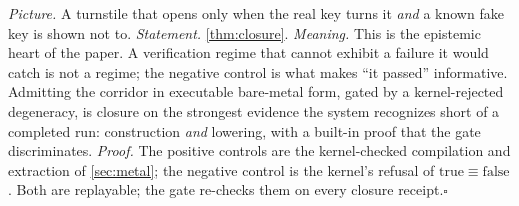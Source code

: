 \documentclass[11pt,letterpaper]{article}
\theoremstyle{plain}
\theoremstyle{definition}
\theoremstyle{remark}
\begin{document}
\noindent\emph{Picture.} A turnstile that opens only when the real key turns it
\emph{and} a known fake key is shown not to. \emph{Statement.}
\cref{thm:closure}. \emph{Meaning.} This is the epistemic heart of the paper. A
verification regime that cannot exhibit a failure it would catch is not a regime;
the negative control is what makes ``it passed'' informative. Admitting the
corridor in executable bare-metal form, gated by a kernel-rejected degeneracy, is
closure on the strongest evidence the system recognizes short of a completed run:
construction \emph{and} lowering, with a built-in proof that the gate
discriminates. \emph{Proof.} The positive controls are the kernel-checked
compilation and extraction of \cref{sec:metal}; the negative control is the kernel's
refusal of $\mathrm{true}\equiv\mathrm{false}$. Both are replayable; the gate
re-checks them on every closure receipt.\hfill$\square$
\end{document}
